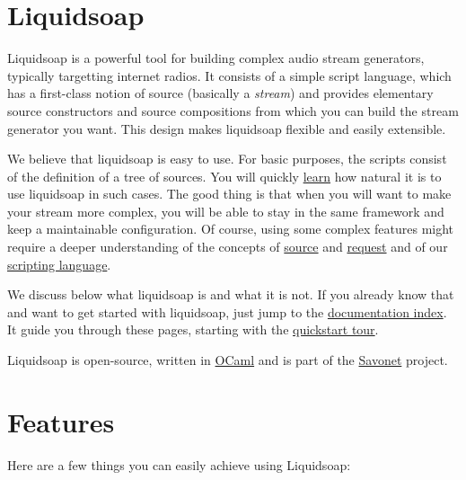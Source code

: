 \section{Liquidsoap}
Liquidsoap is a powerful tool for building complex audio stream generators,
typically targetting internet radios. It consists of a simple script language,
which has a first-class notion of source (basically a \emph{stream}) and
provides elementary source constructors and source compositions
from which you can build the stream generator you want.
This design makes liquidsoap flexible and easily extensible.

We believe that liquidsoap is easy to use. For basic purposes, the scripts 
consist of the definition of a tree of sources.
You will quickly \href{quick_start.html}{learn}
how natural it is to use liquidsoap in such cases. The good thing is that
when you will want to make your stream more complex,
you will be able to stay in the same framework and keep a maintainable 
configuration.
Of course, using some complex features might require a deeper
understanding of the concepts of \href{sources.html}{source} and
\href{requests.html}{request} and of our \href{language.html}{scripting language}.

We discuss below what liquidsoap is and what it is not.
If you already know that and want to get started with liquidsoap,
just jump to the \href{documentation.html}{documentation index}.
It guide you through these pages,
starting with the \href{quick_start.html}{quickstart tour}.

Liquidsoap is open-source,
written in \href{http://caml.inria.fr}{OCaml}
and is part of the \href{http://savonet.sf.net}{Savonet} project.

\section{Features}
Here are a few things you can easily achieve using Liquidsoap:

